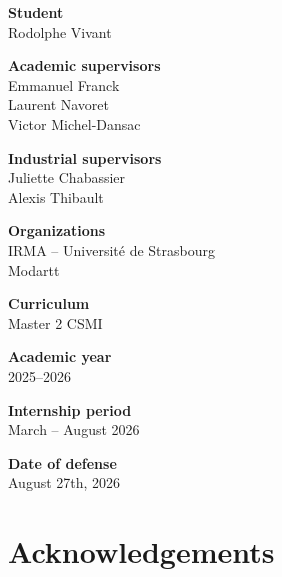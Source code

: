 \documentclass[11pt,a4paper]{report}
\theoremstyle{plain}
\theoremstyle{definition}
\begin{document}
\begin{titlepage}
\noindent
\begin{minipage}[t]{0.57\textwidth}

    \textbf{Student}\\
    Rodolphe Vivant

    \vspace{0.5cm}

    \textbf{Academic supervisors}\\
    Emmanuel Franck\\
    Laurent Navoret\\
    Victor Michel-Dansac

    \vspace{0.5cm}

    \textbf{Industrial supervisors}\\
    Juliette Chabassier\\
    Alexis Thibault

    \vspace{0.5cm}

    \textbf{Organizations}\\
    IRMA -- Université de Strasbourg\\
    Modartt

\end{minipage}
\hfill
\begin{minipage}[t]{0.35\textwidth}
    \raggedleft

    \textbf{Curriculum}\\
    Master 2 CSMI

    \vspace{0.5cm}

    \textbf{Academic year}\\
    2025--2026

    \vspace{0.5cm}

    \textbf{Internship period}\\
    March -- August 2026

    \vspace{0.5cm}

    \textbf{Date of defense}\\
    August 27th, 2026

\end{minipage}

\vspace{1.2cm}

\end{titlepage}

\dominitoc


\chapter*{Acknowledgements}
\mtcaddchapter
{}
\end{document}
